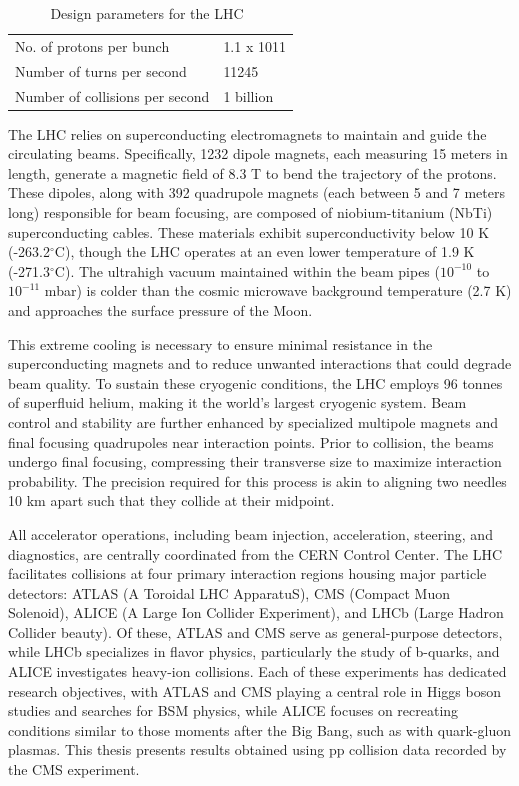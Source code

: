 \begin{table}[]
\begin{tabular}{|l|l|}
    No. of protons per bunch        & 1.1 x 1011                                                                      \\
    Number of turns per second      & 11245                                                                           \\
    Number of collisions per second & 1 billion                                                                       \\ \hline
    \end{tabular}
    \caption{Design parameters for the LHC~\cite{CERNBroc79}}
    \label{tab:LHCparam}
\end{table}

The LHC relies on superconducting electromagnets to maintain and guide the circulating beams. Specifically, 1232 dipole magnets, each measuring 15 meters in length, generate a magnetic field of 8.3 T to bend the trajectory of the protons. These dipoles, along with 392 quadrupole magnets (each between 5 and 7 meters long) responsible for beam focusing, are composed of niobium-titanium (NbTi) superconducting cables. These materials exhibit superconductivity below 10 K (-263.2$^{\circ}$C), though the LHC operates at an even lower temperature of 1.9 K (-271.3$^{\circ}$C). The ultrahigh vacuum maintained within the beam pipes ($10^{-10}$ to $10^{-11}$ mbar) is colder than the cosmic microwave background temperature (2.7 K) and approaches the surface pressure of the Moon. 

This extreme cooling is necessary to ensure minimal resistance in the superconducting magnets and to reduce unwanted interactions that could degrade beam quality. To sustain these cryogenic conditions, the LHC employs 96 tonnes of superfluid helium, making it the world’s largest cryogenic system. Beam control and stability are further enhanced by specialized multipole magnets and final focusing quadrupoles near interaction points. Prior to collision, the beams undergo final focusing, compressing their transverse size to maximize interaction probability. The precision required for this process is akin to aligning two needles 10 km apart such that they collide at their midpoint. 

All accelerator operations, including beam injection, acceleration, steering, and diagnostics, are centrally coordinated from the CERN Control Center. The LHC facilitates collisions at four primary interaction regions housing major particle detectors: ATLAS (A Toroidal LHC ApparatuS), CMS (Compact Muon Solenoid), ALICE (A Large Ion Collider Experiment), and LHCb (Large Hadron Collider beauty). Of these, ATLAS and CMS serve as general-purpose detectors, while LHCb specializes in flavor physics, particularly the study of b-quarks, and ALICE investigates heavy-ion collisions. Each of these experiments has dedicated research objectives, with ATLAS and CMS playing a central role in Higgs boson studies and searches for BSM physics, while ALICE focuses on recreating conditions similar to those moments after the Big Bang, such as with quark-gluon plasmas. This thesis presents results obtained using pp collision data recorded by the CMS experiment.

